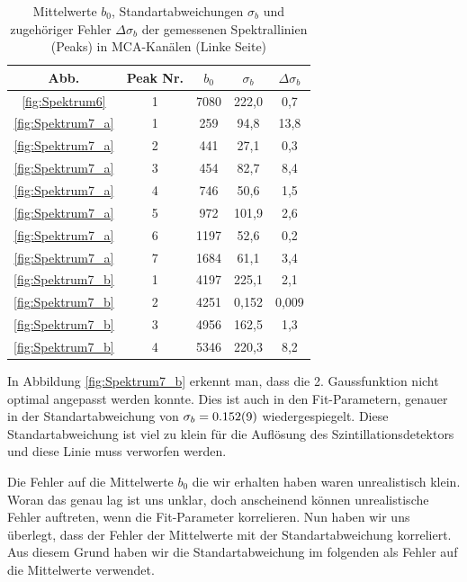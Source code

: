 \begin{table}
    \centering
    \caption{Mittelwerte $b_0$, Standartabweichungen $\sigma_b$ und zugehöriger Fehler $\Delta \sigma_b$ der gemessenen Spektrallinien (Peaks) in MCA-Kanälen (Linke Seite)}
    \begin{tabular}{|c|c|c|c|c|}
        \hline
         Abb. & Peak Nr. & $b_0$ & $\sigma_b$ & $\Delta \sigma_b$ \\ \hline \hline
         \ref{fig:Spektrum6} & 1 & 7080 & 222,0 & 0,7 \\ \hline
         \ref{fig:Spektrum7_a} & 1 & 259 & 94,8 & 13,8 \\ \hline
         \ref{fig:Spektrum7_a} & 2 & 441 & 27,1 & 0,3 \\ \hline
         \ref{fig:Spektrum7_a} & 3 & 454 & 82,7 & 8,4 \\ \hline
         \ref{fig:Spektrum7_a} & 4 & 746 & 50,6 & 1,5 \\ \hline
         \ref{fig:Spektrum7_a} & 5 & 972 & 101,9 & 2,6 \\ \hline
         \ref{fig:Spektrum7_a} & 6 & 1197 & 52,6 & 0,2 \\ \hline
         \ref{fig:Spektrum7_a} & 7 & 1684 & 61,1 & 3,4 \\ \hline
         \ref{fig:Spektrum7_b} & 1 & 4197 & 225,1 & 2,1 \\ \hline
         \ref{fig:Spektrum7_b} & 2 & 4251 & 0,152 & 0,009 \\ \hline
         \ref{fig:Spektrum7_b} & 3 & 4956 & 162,5 & 1,3 \\ \hline
         \ref{fig:Spektrum7_b} & 4 & 5346 & 220,3 & 8,2 \\ \hline
    \end{tabular}
    \label{tab:PeakWerte2}
\end{table}

In Abbildung \ref{fig:Spektrum7_b} erkennt man, dass die 2. Gaussfunktion nicht optimal angepasst werden konnte.
Dies ist auch in den Fit-Parametern, genauer in der Standartabweichung von $\sigma_b = \SI{0,152 \pm 0,009}{}$ wiedergespiegelt.
Diese Standartabweichung ist viel zu klein für die Auflösung des Szintillationsdetektors und diese Linie muss verworfen werden.

Die Fehler auf die Mittelwerte $b_0$ die wir erhalten haben waren unrealistisch klein.
Woran das genau lag ist uns unklar, doch anscheinend können unrealistische Fehler auftreten, wenn die Fit-Parameter korrelieren.
Nun haben wir uns überlegt, dass der Fehler der Mittelwerte mit der Standartabweichung korreliert.
Aus diesem Grund haben wir die Standartabweichung im folgenden als Fehler auf die Mittelwerte verwendet.


